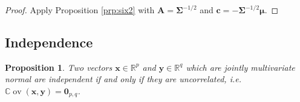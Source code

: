 \documentclass[
]{book}
\newtheorem{proposition}{Proposition}[chapter]
\theoremstyle{definition}
\theoremstyle{definition}
\theoremstyle{definition}
\theoremstyle{definition}
\theoremstyle{remark}
\begin{document}
\begin{proof}
Apply Proposition \ref{prp:six2} with \(\mathbf A= \boldsymbol{\Sigma}^{-1/2}\) and \(\mathbf c= - \boldsymbol{\Sigma}^{-1/2} {\boldsymbol{\mu}}\).
\end{proof}

\hypertarget{independence}{%
\subsection{Independence}\label{independence}}

\begin{proposition}
\protect\hypertarget{prp:six4}{}\label{prp:six4}Two vectors \(\mathbf x\in\mathbb{R}^p\) and \(\mathbf y\in\mathbb{R}^q\) which are jointly multivariate normal are independent if and only if they are uncorrelated, i.e.~\({\mathbb{C}\operatorname{ov}}(\mathbf x,\mathbf y) = {\boldsymbol 0}_{p,q}\).
\end{proposition}
\end{document}
